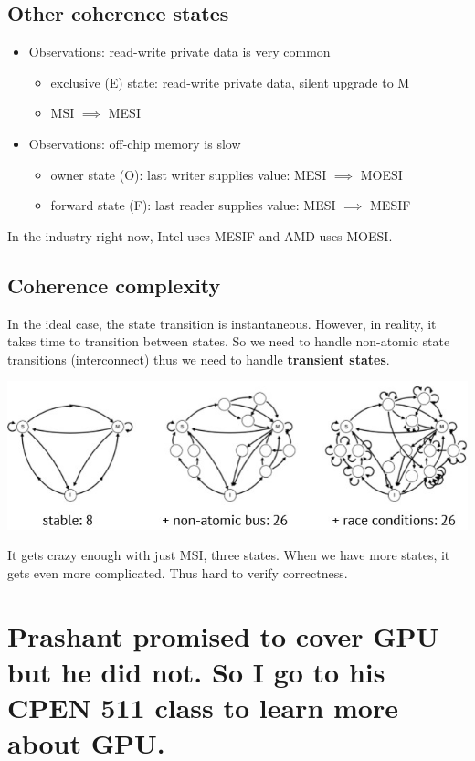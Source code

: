 \documentclass[letterpaper,12pt]{article}
\begin{document}
\subsection{Other coherence states}
\begin{itemize}
    \item Observations: read-write private data is very common\begin{itemize}
              \item exclusive (E) state: read-write private data, silent upgrade to M
              \item MSI $\implies$ MESI
          \end{itemize}
    \item Observations: off-chip memory is slow\begin{itemize}
              \item owner state (O): last writer supplies value: MESI $\implies$ MOESI
              \item forward state (F): last reader supplies value: MESI $\implies$ MESIF
          \end{itemize}
\end{itemize}
In the industry right now, Intel uses MESIF and AMD uses MOESI.
\subsection{Coherence complexity}
In the ideal case, the state transition is instantaneous. However, in reality, it takes time to transition between states. So we need to handle non-atomic state transitions (interconnect) thus we need to handle \textbf{transient states}.

\includegraphics*[scale=0.8]{./Image/MSI non-automic.jpg}

It gets crazy enough with just MSI, three states. When we have more states, it gets even more complicated. Thus hard to verify correctness.

\section{Prashant promised to cover GPU but he did not. So I go to his CPEN 511 class to learn more about GPU.}
\end{document}
